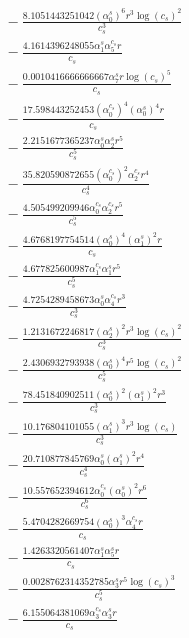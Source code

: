 \documentclass[10pt]{article}
\begin{document}
\begin{align*}
&{}  - \frac{8.1051443251042 \left(\alpha_{0}^s\right)^{6} r^{3} \log{\left(c_{s} \right)}^{2}}{c_{s}^{3}} \\
&{}  - \frac{4.1614396248055 \alpha_{1}^s \alpha_{5}^{c_s} r}{c_{s}} \\
&{}  - \frac{0.0010416666666667 \alpha_{7}^s r \log{\left(c_{s} \right)}^{5}}{c_{s}} \\
&{}  - \frac{17.598443252453 \left(\alpha_{0}^{c_s}\right)^{4} \left(\alpha_{0}^s\right)^{4} r}{c_{s}} \\
&{}  - \frac{2.2151677365237 \alpha_{0}^s \alpha_{2}^s r^{5}}{c_{s}^{5}} \\
&{}  - \frac{35.820590872655 \left(\alpha_{0}^{c_s}\right)^{2} \alpha_{2}^{c_s} r^{4}}{c_{s}^{4}} \\
&{}  - \frac{4.505499209946 \alpha_{0}^{c_s} \alpha_{2}^{c_s} r^{5}}{c_{s}^{5}} \\
&{}  - \frac{4.6768197754514 \left(\alpha_{0}^s\right)^{4} \left(\alpha_{1}^s\right)^{2} r}{c_{s}} \\
&{}  - \frac{4.677825600987 \alpha_{1}^{c_s} \alpha_{1}^s r^{5}}{c_{s}^{5}} \\
&{}  - \frac{4.7254289458673 \alpha_{0}^s \alpha_{4}^{c_s} r^{3}}{c_{s}^{3}} \\
&{}  - \frac{1.2131672246817 \left(\alpha_{2}^s\right)^{2} r^{3} \log{\left(c_{s} \right)}^{2}}{c_{s}^{3}} \\
&{}  - \frac{2.4306932793938 \left(\alpha_{0}^s\right)^{4} r^{5} \log{\left(c_{s} \right)}^{2}}{c_{s}^{5}} \\
&{}  - \frac{78.451840902511 \left(\alpha_{0}^s\right)^{2} \left(\alpha_{1}^s\right)^{2} r^{3}}{c_{s}^{3}} \\
&{}  - \frac{10.176804101055 \left(\alpha_{1}^s\right)^{3} r^{3} \log{\left(c_{s} \right)}}{c_{s}^{3}} \\
&{}  - \frac{20.710877845769 \alpha_{0}^s \left(\alpha_{1}^s\right)^{2} r^{4}}{c_{s}^{4}} \\
&{}  - \frac{10.557652394612 \alpha_{0}^{c_s} \left(\alpha_{0}^s\right)^{2} r^{6}}{c_{s}^{6}} \\
&{}  - \frac{5.4704282669754 \left(\alpha_{0}^s\right)^{3} \alpha_{4}^{c_s} r}{c_{s}} \\
&{}  - \frac{1.4263320561407 \alpha_{1}^s \alpha_{5}^s r}{c_{s}} \\
&{}  - \frac{0.0028762314352785 \alpha_{3}^s r^{5} \log{\left(c_{s} \right)}^{3}}{c_{s}^{5}} \\
&{}  - \frac{6.155064381069 \alpha_{3}^{c_s} \alpha_{3}^s r}{c_{s}} \\

\end{align*}
\end{document}
